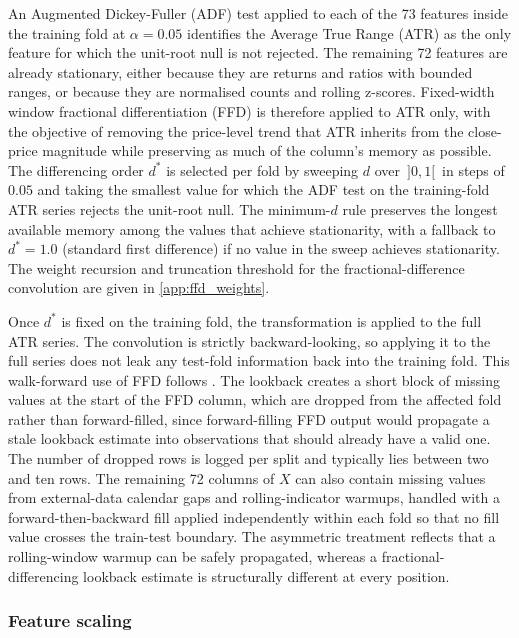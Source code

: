 An Augmented Dickey-Fuller (ADF) test applied to each of the 73 features inside the training fold at $\alpha = 0.05$ identifies the Average True Range (ATR) as the only feature for which the unit-root null is not rejected. The remaining 72 features are already stationary, either because they are returns and ratios with bounded ranges, or because they are normalised counts and rolling z-scores. Fixed-width window fractional differentiation (FFD) \citep[Chapter 5]{lopez_de_prado_2018} is therefore applied to ATR only, with the objective of removing the price-level trend that ATR inherits from the close-price magnitude while preserving as much of the column's memory as possible. The differencing order $d^{\ast}$ is selected per fold by sweeping $d$ over $\,]0, 1[\,$ in steps of $0.05$ and taking the smallest value for which the ADF test on the training-fold ATR series rejects the unit-root null. The minimum-$d$ rule preserves the longest available memory among the values that achieve stationarity, with a fallback to $d^{\ast} = 1.0$ (standard first difference) if no value in the sweep achieves stationarity. The weight recursion and truncation threshold for the fractional-difference convolution are given in \label{ref:ffd_weights_call}\autoref{app:ffd_weights}.

Once $d^{\ast}$ is fixed on the training fold, the transformation is applied to the full ATR series. The convolution is strictly backward-looking, so applying it to the full series does not leak any test-fold information back into the training fold. This walk-forward use of FFD follows \citet{slepaczuk_bieganowski_2024}. The lookback creates a short block of missing values at the start of the FFD column, which are dropped from the affected fold rather than forward-filled, since forward-filling FFD output would propagate a stale lookback estimate into observations that should already have a valid one. The number of dropped rows is logged per split and typically lies between two and ten rows. The remaining 72 columns of $X$ can also contain missing values from external-data calendar gaps and rolling-indicator warmups, handled with a forward-then-backward fill applied independently within each fold so that no fill value crosses the train-test boundary. The asymmetric treatment reflects that a rolling-window warmup can be safely propagated, whereas a fractional-differencing lookback estimate is structurally different at every position.


\subsubsection{Feature scaling}\label{subsubsec:scaling}

